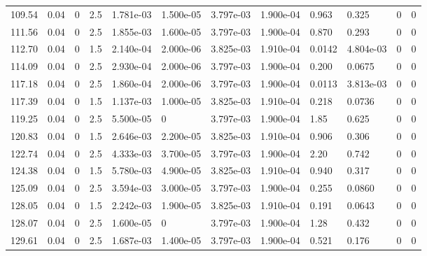 \documentclass[preview]{standalone}
\begin{document}
{{{\begin{tabular}{L{1.2cm}C{1.2cm} C{0.3cm}C{0.5cm} C{1.4cm}C{1.4cm} C{1.4cm}C{1.4cm} C{1.6cm}C{1.6cm} C{1.6cm}C{1.6cm}}
  109.54  &  0.04  & 0     & 2.5 &  1.781e-03  & 1.500e-05  &  3.797e-03&   1.900e-04& 0.963 & 0.325   &  0 & 0  \\ 
  111.56  &  0.04  & 0     & 2.5 &  1.855e-03  & 1.600e-05  &  3.797e-03&   1.900e-04& 0.870 & 0.293   &  0 & 0  \\ 
  112.70  &  0.04  & 0     & 1.5 &  2.140e-04  & 2.000e-06  &  3.825e-03&   1.910e-04& 0.0142 & 4.804e-03   &  0 & 0  \\ 
  114.09  &  0.04  & 0     & 2.5 &  2.930e-04  & 2.000e-06  &  3.797e-03&   1.900e-04& 0.200 & 0.0675   &  0 & 0  \\ 
  117.18  &  0.04  & 0     & 2.5 &  1.860e-04  & 2.000e-06  &  3.797e-03&   1.900e-04& 0.0113 & 3.813e-03   &  0 & 0  \\ 
  117.39  &  0.04  & 0     & 1.5 &  1.137e-03  & 1.000e-05  &  3.825e-03&   1.910e-04& 0.218 & 0.0736   &  0 & 0  \\ 
  119.25  &  0.04  & 0     & 2.5 &  5.500e-05  & 0  &  3.797e-03&   1.900e-04& 1.85 & 0.625   &  0 & 0  \\ 
  120.83  &  0.04  & 0     & 1.5 &  2.646e-03  & 2.200e-05  &  3.825e-03&   1.910e-04& 0.906 & 0.306   &  0 & 0  \\ 
  122.74  &  0.04  & 0     & 2.5 &  4.333e-03  & 3.700e-05  &  3.797e-03&   1.900e-04& 2.20 & 0.742   &  0 & 0  \\ 
  124.38  &  0.04  & 0     & 1.5 &  5.780e-03  & 4.900e-05  &  3.825e-03&   1.910e-04& 0.940 & 0.317   &  0 & 0  \\ 
  125.09  &  0.04  & 0     & 2.5 &  3.594e-03  & 3.000e-05  &  3.797e-03&   1.900e-04& 0.255 & 0.0860   &  0 & 0  \\ 
  128.05  &  0.04  & 0     & 1.5 &  2.242e-03  & 1.900e-05  &  3.825e-03&   1.910e-04& 0.191 & 0.0643   &  0 & 0  \\ 
  128.07  &  0.04  & 0     & 2.5 &  1.600e-05  & 0  &  3.797e-03&   1.900e-04& 1.28 & 0.432   &  0 & 0  \\ 
  129.61  &  0.04  & 0     & 2.5 &  1.687e-03  & 1.400e-05  &  3.797e-03&   1.900e-04& 0.521 & 0.176   &  0 & 0  \\ 
\hline 
\end{tabular} 

}}}
\end{document}
